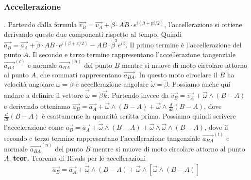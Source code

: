 \subsubsection{Accellerazione}. Partendo dalla formula $\vec{v_B} = \vec{v_A} + \dot{\beta} \cdot AB \cdot e^{i(\beta + pi/2)}$, l'accellerazione si ottiene derivando queste due componenti rispetto al tempo.\newline
Quindi $\vec{a_B} = \vec{a_A} + \ddot{\beta} \cdot AB \cdot e^{i(\beta+\pi/2)}-AB \cdot \dot{\beta}^2 e^{i \beta}$.\newline
Il primo termine è l'accellerazione del punto $A$. Il secondo e terzo termine rappresentano l'accellerazione tangenziale $\vec{a_{BA}}^{(t)}$ e normale $\vec{a_{BA}}^{(n)}$ del punto $B$ mentre si muove di moto circolare attorno al punto $A$, che sommati rappresentano $\vec{a_{BA}}$. In questo moto ciroclare il $B$ ha velocità angolare $\omega = \dot{\beta}$ e accellerazione angolare $\dot{\omega} = \ddot{\beta}$. Possiamo anche qui andare a definire il vettore $\vec{\dot{\omega}} = \ddot{\beta}\vec{k}$.\newline
Partendo invece da $\vec{v_B} = \vec{v_A} + \vec{\omega}\land(B-A)$ e derivando otteniamo $\vec{a_B} = \vec{a_A} + \dot{\vec{\omega}}\land (B-A) + \vec{\omega} \land \frac{d}{dt}(B-A)$, dove $\frac{d}{dt}(B-A)$ è esattamente la quantità scritta prima. Possiamo quindi scrivere l'accelerazione come $\vec{a_B}= \vec{a_A} + \dot{\vec{\omega}} \land (B-A) + \vec{\omega} \land \vec{\omega} \land (B-A)$, dove il secondo e terzo termine rappresentano l'accellerazione tangenziale $\vec{a_{BA}}^{(t)}$ e normale $\vec{a_{BA}}^{(n)}$ del punto $B$ mentre si muove di moto circolare attorno al punto $A$.\newline
\textbf{teor.} Teorema di Rivals per le accellerazioni
\[
    \vec{a_B}= \vec{a_A} + \dot{\vec{\omega}} \land (B-A) + \vec{\omega} \land [\vec{\omega} \land (B-A)]
\]